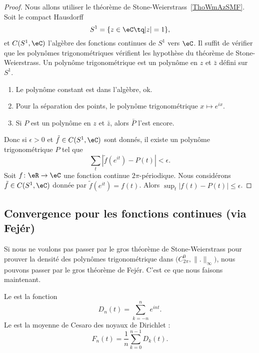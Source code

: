 \begin{proof}
    Nous allons utiliser le théorème de Stone-Weierstrass~\ref{ThoWmAzSMF}. Soit le compact Hausdorff
    \begin{equation}
        S^1=\{ z\in \eC\tq | z |=1 \},
    \end{equation}
    et \( C(S^1,\eC)\) l'algèbre des fonctions continues de \( S^1\) vers \( \eC\). Il suffit de vérifier que les polynômes trigonométriques vérifient les hypothèse du théorème de Stone-Weierstrass. Un polynôme trigonométrique est un polynôme en \( z\) et \( \bar z\) défini sur \( S^1\).
    \begin{enumerate}
        \item
            Le polynôme constant est dans l'algèbre, ok.
        \item
            Pour la séparation des points, le polynôme trigonométrique \( x\mapsto  e^{ix}\).
        \item
            Si \( P\) est un polynôme en \( z\) et \( \bar z\), alors \( \bar P\) l'est encore.
    \end{enumerate}
    Donc si \( \epsilon>0\) et \( \tilde f\in C(S^1,\eC)\) sont donnés, il existe un polynôme trigonométrique \( P\) tel que
    \begin{equation}
        \sum_t| \tilde f( e^{it})-P(t) |<\epsilon.
    \end{equation}
    Soit \( f\colon \eR\to \eC\) une fonction continue \( 2\pi\)-périodique. Nous considérons \( \tilde f\in C(S^1,\eC)\) donnée par \( \tilde f( e^{it})=f(t)\). Alors \( \sup_t| f(t)-P(t) |\leq \epsilon\).
\end{proof}



\subsection{Convergence pour les fonctions continues (via Fejér)}
Si nous ne voulons pas passer par le gros théorème de Stone-Weierstrass pour prouver la densité des polynômes trigonométrique dans \( \big( C^0_{2\pi},\| . \|_{\infty} \big)\), nous pouvons passer par le gros théorème de Fejér. C'est ce que nous faisons maintenant.

Le  est la fonction
\begin{equation}
    D_n(t)=\sum_{k=-n}^n e^{int}.
\end{equation}
Le  est la moyenne de Cesaro des noyaux de Dirichlet :
\begin{equation}
    F_n(t)=\frac{1}{ n }\sum_{k=0}^{n-1}D_k(t).
\end{equation}

